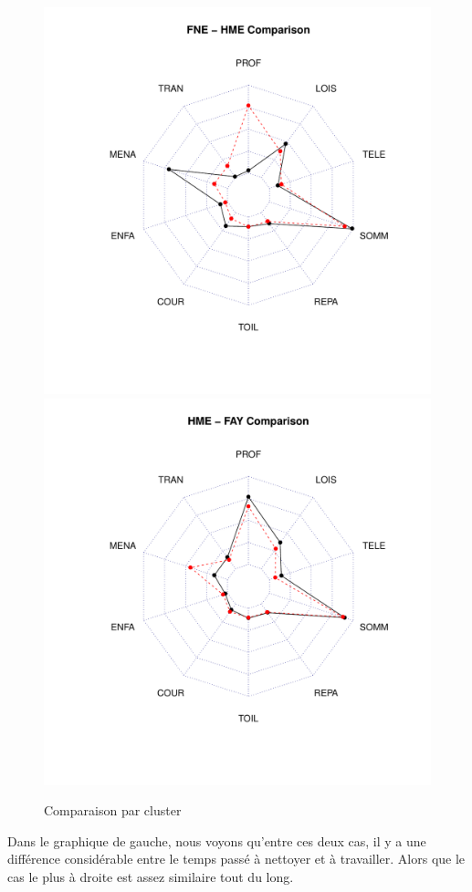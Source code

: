 \documentclass[11pt]{article}
\begin{document}
\begin{figure}[h]
  \centering
  \includegraphics[scale=0.4]{../plot/fne-hme-comparison.pdf}
  \includegraphics[scale=0.4]{../plot/hme-fay-comparison.pdf}
  \caption{Comparaison par cluster}
  \label{fig:fne-hme-comparison}
\end{figure}
Dans le graphique de gauche, nous voyons qu'entre ces deux cas, il y a une
différence considérable entre le temps passé à nettoyer et à travailler. Alors
que le cas le plus à droite est assez similaire tout du long.
\end{document}
